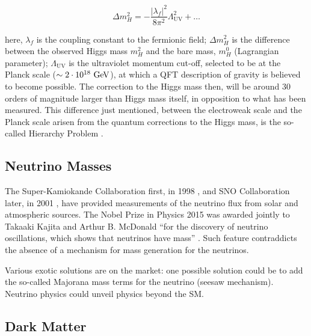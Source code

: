
			\begin{equation}
			\label{eq:mH_fermionic_contribution}
			\Delta m_H^2 = - \frac{ | \lambda_f  |^2}{8 \pi ^2} \Lambda_{\mathrm{UV}}^2 + \dots 
			\end{equation}


			\noindent here, $\lambda_f$ is the coupling constant to the fermionic field; $\Delta m_H^2$ is the difference between the observed Higgs mass $m_H^2$ and the bare mass, $m_H^0$ (Lagrangian parameter); $\Lambda_{\mathrm{UV}}$ is the ultraviolet momentum cut-off, selected to be at the Planck scale ($\sim 2 \cdot 10^{18} \gev$), at which a QFT description of gravity is believed to become possible. The correction to the Higgs mass then, will be around 30 orders of magnitude larger than Higgs mass itself, in opposition to what has been measured. This difference just mentioned, between the electroweak scale and the Planck scale arisen from the quantum corrections to the Higgs mass, is the so-called Hierarchy Problem \cite{Weinberg1976}.


		\subsection*{Neutrino Masses}

			The Super-Kamiokande Collaboration first, in 1998 \cite{SK1998}, and SNO Collaboration later, in 2001 \cite{SNO2001}, have provided measurements of the neutrino flux from solar and atmospheric sources. 
			The Nobel Prize in Physics 2015 was awarded jointly to Takaaki Kajita and Arthur B. McDonald ``for the discovery of neutrino oscillations, which shows that neutrinos have mass'' \cite{Nobel2015}. Such feature contraddicts the absence of a mechanism for mass generation for the neutrinos. 

			Various exotic solutions are on the market: one possible solution could be to add the so-called Majorana mass terms for the neutrino (seesaw mechanism). Neutrino physics could unveil physics beyond the SM.



		\subsection*{Dark Matter}

